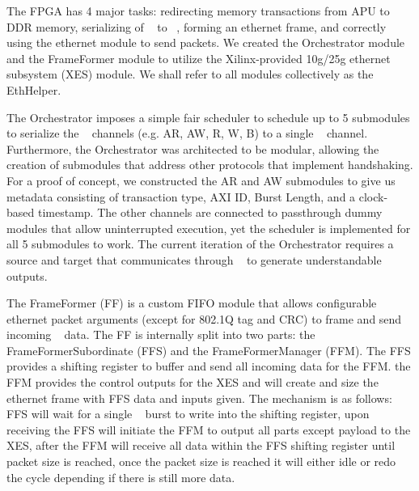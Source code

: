 The FPGA has 4 major tasks: redirecting memory transactions from APU to DDR memory, serializing of \axifull~ to \axistream~, forming an ethernet frame, and correctly using the ethernet module to send packets. We created the Orchestrator module and the FrameFormer module to utilize the Xilinx-provided 10g/25g ethernet subsystem (XES) module. We shall refer to all modules collectively as the EthHelper.

The Orchestrator imposes a simple fair scheduler to schedule up to 5 submodules to serialize the \axifull~ channels (e.g. AR, AW, R, W, B) to a single \axistream~ channel. Furthermore, the Orchestrator was architected to be modular, allowing the creation of submodules that address other protocols that implement handshaking. For a proof of concept, we constructed the AR and AW submodules to give us metadata consisting of transaction type, AXI ID, Burst Length, and a clock-based timestamp. The other channels are connected to passthrough dummy modules that allow uninterrupted execution, yet the scheduler is implemented for all 5 submodules to work. The current iteration of the Orchestrator requires a source and target that communicates through \axifull~ to generate understandable \axistream~ outputs.

The FrameFormer (FF) is a custom FIFO module that allows configurable ethernet packet arguments (except for 802.1Q tag and CRC) to frame and send incoming \axistream~ data. The FF is internally split into two parts: the FrameFormerSubordinate (FFS) and the FrameFormerManager (FFM). The FFS provides a shifting register to buffer and send all incoming data for the FFM. the FFM provides the control outputs for the XES and will create and size the ethernet frame with FFS data and inputs given. The mechanism is as follows: FFS will wait for a single \axistream~ burst to write into the shifting register, upon receiving the FFS will initiate the FFM to output all parts except payload to the XES, after the FFM will receive all data within the FFS shifting register until packet size is reached, once the packet size is reached it will either idle or redo the cycle depending if there is still more data.





